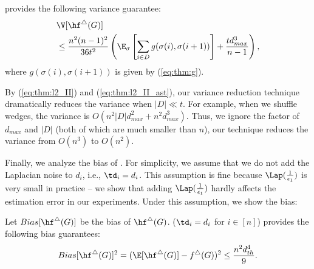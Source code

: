 \begin{theorem}
\label{thm:var_II_ast}
\AlgWSTriVR{} provides the following variance guarantee:
\begin{align}
& \V[\hf^\triangle(G)] \nonumber\\ 
& \leq \frac{n^2(n-1)^2}{36t^2} \left(\E_\sigma \left[ \sum_{i \in D} 
g(\sigma(i),\sigma(i+1)) \right] + \frac{t d_{max}^3}{n-1}\right), \label{eq:thm:l2_II_ast}
\end{align}
where $g(\sigma(i),\sigma(i+1))$ is given by (\ref{eq:thm:g}). 
\end{theorem}
By (\ref{eq:thm:l2_II}) and (\ref{eq:thm:l2_II_ast}), our variance reduction technique dramatically reduces the variance when $|D| \ll t$. 
For example, when we shuffle wedges, the variance is $O(n^2|D|d_{max}^2 + n^2 d_{max}^3)$. 
Thus, we ignore the factor of $d_{max}$ and $|D|$ (both of which are much smaller than $n$), our technique reduces the variance from $O(n^3)$ to $O(n^2)$. 

Finally, we analyze the bias of \AlgWSTriVR{}. 
For simplicity, we assume that we do not add the Laplacian noise to $d_i$, i.e., $\td_i = d_i$. 
This assumption is fine because 
$\Lap(\frac{1}{\epsilon_1})$ is very small in practice -- we show that adding $\Lap(\frac{1}{\epsilon_1})$ hardly affects the estimation error in our experiments. 
Under this assumption, we show the bias: 

\begin{theorem}
\label{thm:bias_II_ast}
Let $Bias[\hf^\triangle(G)]$ be the bias of $\hf^\triangle(G)$. 
\AlgWSTriVR{} ($\td_i = d_i$ for $i\in[n]$) 
provides the following bias guarantees:
\begin{align}
    Bias[\hf^\triangle(G)]^2 
    = (\E[\hf^\triangle(G)] - f^\triangle(G))^2 
    \leq \frac{n^2 d_{th}^4}{9}. 
    \label{eq:thm:bias_II_ast}
\end{align}
\end{theorem}

